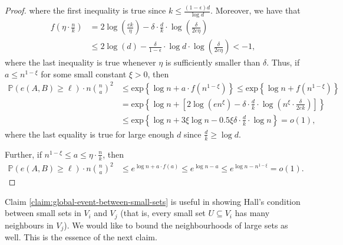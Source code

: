 \documentclass[notitlepage]{scrartcl}
\renewcommand{\exp}{\text{exp}}
\renewcommand{\Pr}{\mathbb{P}}
\begin{document}
\begin{proof}
    where the first inequality is true since $k \le \frac{(1-\epsilon)d}{\log d}$. Moreover, we have that 
    \begin{align*}
        f\left(\eta \cdot \frac{n}{k}\right) &= 2 \log \left(\frac{e k}{\eta}\right) - \delta \cdot \frac{d}{k} \cdot \log\left(\frac{\delta}{2 e \eta}\right) \\
        &\le 2\log(d) - \frac{\delta}{1-\epsilon} \cdot \log d \cdot \log\left(\frac{\delta}{2 e \eta}\right) < -1,
    \end{align*}        
    where the last inequality is true whenever $\eta$ is sufficiently smaller than $\delta$. Thus, if $a \le n^{1-\xi}$ for some small constant $\xi > 0$, then
    \begin{align*}
        \Pr(e(A, B) \ge \ell) \cdot n \binom{n}{a}^2 &\le \exp\left\{\log n + a \cdot f\left(n^{1-\xi}\right)\right\} \le  \exp\left\{\log n + f\left(n^{1-\xi}\right)\right\}\\
        &= \exp\left\{\log n + \left[2 \log (e n^\xi) - \delta \cdot \frac{d}{k} \cdot \log\left(n^\xi \cdot \frac{\delta}{2ek}\right)\right]\right\} \\
        &\le \exp\left\{\log n + 3 \xi \log n - 0.5 \xi \delta \cdot \frac{d}{k} \cdot \log n\right\} = o(1),        
    \end{align*}
    where the last equality is true for large enough $d$ since $\frac{d}{k} \ge \log d$.
    
    Further, if $n^{1 - \xi} \le a \le \eta \cdot \frac{n}{k}$, then
    \begin{align*}
        \Pr(e(A, B) \ge \ell) \cdot n \binom{n}{a}^2 &\le e^{\log n + a \cdot f(a)}
        \le e^{\log n - a} 
        \le e^{\log n - n^{1-\xi}}  = o(1).
    \end{align*}        
\end{proof}

Claim \ref{claim:global-event-between-small-sets} is useful in showing Hall's condition between small sets in $V_i$ and $V_j$ (that is, every small set $U \subseteq V_i$ has many neighbours in $V_j$). We would like to bound the neighbourhoods of large sets as well. This is the essence of the next claim.
\end{document}
